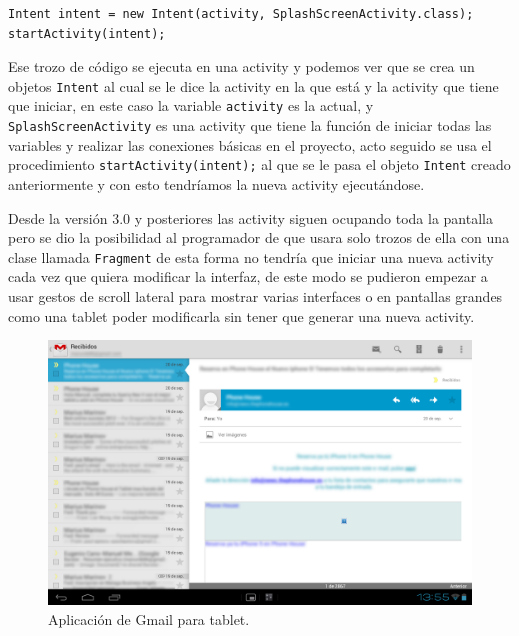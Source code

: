 \begin{lstlisting}[style=Java]
Intent intent = new Intent(activity, SplashScreenActivity.class);
startActivity(intent);
\end{lstlisting}

Ese trozo de código se ejecuta en una activity y podemos ver que se crea un objetos \lstinline{Intent} al cual se le dice la activity en la que está y la activity que tiene que iniciar, en este caso la variable \lstinline{activity} es la actual, y \lstinline{SplashScreenActivity} es una activity que tiene la función de iniciar todas las variables y realizar las conexiones básicas en el proyecto, acto seguido se usa el procedimiento \lstinline{startActivity(intent);} al que se le pasa el objeto \lstinline{Intent} creado anteriormente y con esto tendríamos la nueva activity ejecutándose.

Desde la versión 3.0 y posteriores las activity siguen ocupando toda la pantalla pero se dio la posibilidad al programador de que usara solo trozos de ella con una clase llamada \lstinline{Fragment} de esta forma no tendría que iniciar una nueva activity cada vez que quiera modificar la interfaz, de este modo se pudieron empezar a usar gestos de scroll lateral para mostrar varias interfaces o en pantallas grandes como una tablet poder modificarla sin tener que generar una nueva activity. 

\begin{figure}
  \centering
    \includegraphics[scale=0.3]{./Android/imagenes/gmailTablet.png}
  \caption{Aplicación de Gmail para tablet.}
  \label{fig:gmailTablet}
\end{figure}

